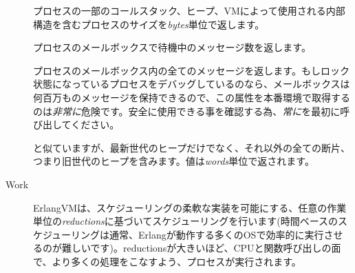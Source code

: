 \begin{description*}
\begin{description}
			\item[] プロセスの一部のコールスタック、ヒープ、VMによって使用される内部構造を含むプロセスのサイズを\emph{bytes}単位で返します。

			\item[] プロセスのメールボックスで待機中のメッセージ数を返します。

			\item[] プロセスのメールボックス内の全てのメッセージを返します。もしロック状態になっているプロセスをデバッグしているのなら、メールボックスは何百万ものメッセージを保持できるので、この属性を本番環境で取得するのは\emph{非常に}危険です。安全に使用できる事を確認する為、\emph{常に}を最初に呼び出してください。

			\item[] と似ていますが、最新世代のヒープだけでなく、それ以外の全ての断片、つまり旧世代のヒープを含みます。値は\emph{words}単位で返されます。
			\end{description}
	\item[Work] \hfill
		\begin{description}
			\item[] ErlangVMは、スケジューリングの柔軟な実装を可能にする、任意の作業単位の\emph{reductions}に基づいてスケジューリングを行います(時間ベースのスケジューリングは通常、Erlangが動作する多くのOSで効率的に実行させるのが難しいです)。reductionsが大きいほど、CPUと関数呼び出しの面で、より多くの処理をこなすよう、プロセスが実行されます。
		\end{description}
\end{description*}

